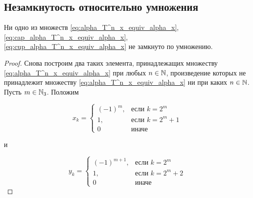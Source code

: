 \subsection{Незамкнутость относительно умножения}

\begin{theorem}
	Ни одно из множеств
	\eqref{eq:alpha_T^n_x_equiv_alpha_x}, \eqref{eq:cap_alpha_T^n_x_equiv_alpha_x}, \eqref{eq:cup_alpha_T^n_x_equiv_alpha_x}
	не замкнуто по умножению.
\end{theorem}

\begin{proof}
	Снова построим два таких элемента, принадлежащих множеству \eqref{eq:alpha_T^n_x_equiv_alpha_x} при любых $n\in\mathbb{N}$,
	произведение которых не принадлежит множеству \eqref{eq:alpha_T^n_x_equiv_alpha_x} ни при каких $n\in\mathbb{N}$.
	Пусть $m\in\mathbb{N}_3$.
	Положим

	\begin{equation}
		x_k = \begin{cases}
			(-1)^m,  & \mbox{если } k = 2^m     \\
			1,                   & \mbox{если } k = 2^m + 1 \\
			0                    & \mbox{иначе }
		\end{cases}
	\end{equation}

	и

	\begin{equation}
		y_k = \begin{cases}
			(-1)^{m+1},  & \mbox{если } k = 2^m     \\
			1,                   & \mbox{если } k = 2^m + 2 \\
			0                    & \mbox{иначе }
		\end{cases}
	\end{equation}


\end{proof}
